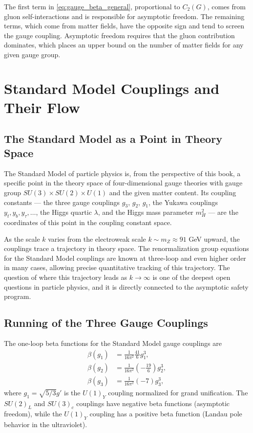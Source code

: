 \documentclass[11pt, twoside, openright]{book}
\theoremstyle{dotted}
\theoremstyle{definition}
\begin{document}
The first term in \eqref{eq:gauge_beta_general}, proportional to $C_2(G)$, comes
from gluon self-interactions and is responsible for asymptotic freedom. The
remaining terms, which come from matter fields, have the opposite sign and tend
to screen the gauge coupling. Asymptotic freedom requires that the gluon contribution
dominates, which places an upper bound on the number of matter fields for any given
gauge group.

\chapter{Standard Model Couplings and Their Flow}
\label{ch:sm_couplings}

\section{The Standard Model as a Point in Theory Space}

The Standard Model of particle physics is, from the perspective of this book, a
specific point in the theory space of four-dimensional gauge theories with gauge
group $SU(3) \times SU(2) \times U(1)$ and the given matter content. Its coupling
constants --- the three gauge couplings $g_3$, $g_2$, $g_1$, the Yukawa couplings
$y_t, y_b, y_\tau, \ldots$, the Higgs quartic $\lambda$, and the Higgs mass
parameter $m_H^2$ --- are the coordinates of this point in the coupling constant
space.

As the scale $k$ varies from the electroweak scale $k \sim m_Z \approx 91$ GeV
upward, the couplings trace a trajectory in theory space. The renormalization group
equations for the Standard Model couplings are known at three-loop and even higher
order in many cases, allowing precise quantitative tracking of this trajectory.
The question of where this trajectory leads as $k \to \infty$ is one of the deepest
open questions in particle physics, and it is directly connected to the asymptotic
safety program.

\section{Running of the Three Gauge Couplings}

The one-loop beta functions for the Standard Model gauge couplings are
\begin{align}
  \beta(g_1) &= \frac{1}{16\pi^2}\frac{41}{6}g_1^3, \\
  \beta(g_2) &= \frac{1}{16\pi^2}\left(-\frac{19}{6}\right)g_2^3, \\
  \beta(g_3) &= \frac{1}{16\pi^2}(-7)g_3^3,
  \label{eq:sm_gauge_betas}
\end{align}
where $g_1 = \sqrt{5/3}g'$ is the $U(1)_Y$ coupling normalized for grand unification.
The $SU(2)_L$ and $SU(3)_c$ couplings have negative beta functions (asymptotic
freedom), while the $U(1)_Y$ coupling has a positive beta function (Landau pole
behavior in the ultraviolet).
\end{document}
